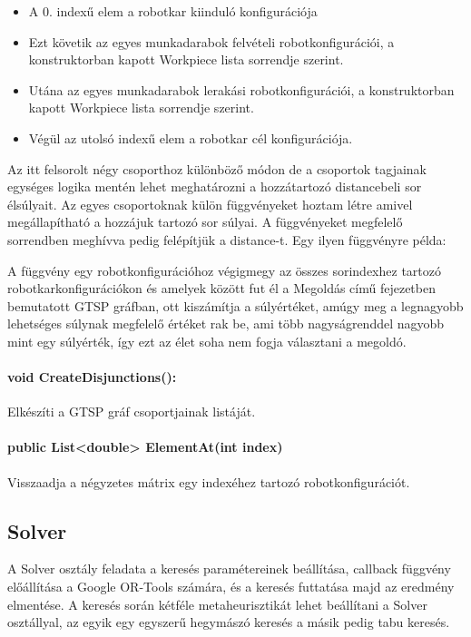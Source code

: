 \begin{itemize}
\item A 0. indexű elem a robotkar kiinduló konfigurációja
\item Ezt követik az egyes munkadarabok felvételi robotkonfigurációi, a konstruktorban kapott Workpiece lista sorrendje szerint.  
\item Utána az egyes munkadarabok lerakási robotkonfigurációi, a konstruktorban kapott Workpiece lista sorrendje szerint.  
\item Végül az utolsó indexű elem a robotkar cél konfigurációja. 
\end{itemize}

Az itt felsorolt négy csoporthoz különböző módon de a csoportok tagjainak egységes logika mentén lehet meghatározni a hozzátartozó distancebeli sor élsúlyait. Az egyes csoportoknak külön függvényeket hoztam létre amivel megállapítható a hozzájuk tartozó sor súlyai. A függvényeket megfelelő sorrendben meghívva pedig felépítjük a distance-t. Egy ilyen függvényre példa:

A függvény egy robotkonfigurációhoz végigmegy az összes sorindexhez tartozó robotkarkonfigurációkon és amelyek között fut él a Megoldás című fejezetben bemutatott GTSP gráfban, ott kiszámítja a súlyértéket, amúgy meg a legnagyobb lehetséges súlynak megfelelő értéket rak be, ami több nagyságrenddel nagyobb mint egy súlyérték, így ezt az élet soha nem fogja választani a megoldó.


\paragraph{void CreateDisjunctions():} 

Elkészíti a GTSP gráf csoportjainak listáját.

\paragraph{public List<double> ElementAt(int index)}

Visszaadja a négyzetes mátrix egy indexéhez tartozó robotkonfigurációt.

\subsection{Solver}

A Solver osztály feladata a keresés paramétereinek beállítása, callback függvény előállítása a Google OR-Tools számára, és a keresés futtatása majd az eredmény elmentése. A keresés során kétféle metaheurisztikát lehet beállítani a Solver osztállyal, az egyik egy egyszerű hegymászó keresés a másik pedig tabu keresés.

